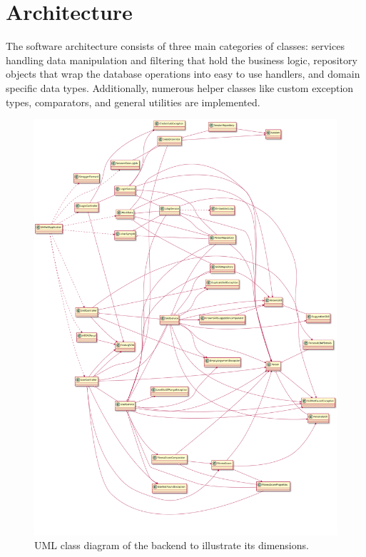 \section{Architecture}
The software architecture consists of three main categories of classes: services handling data manipulation and filtering that hold the business logic, repository objects that wrap the database operations into easy to use handlers, and domain specific data types. Additionally, numerous helper classes like custom exception types, comparators, and general utilities are implemented.
\begin{figure}[!h]
    \centering
    \includegraphics[height=0.55\textheight]{images/uml.png}
    \caption[Backend Class Diagramm]{UML class diagram of the backend to illustrate its dimensions.}
    \label{fig:markovchain}
\end{figure}
\newpage


